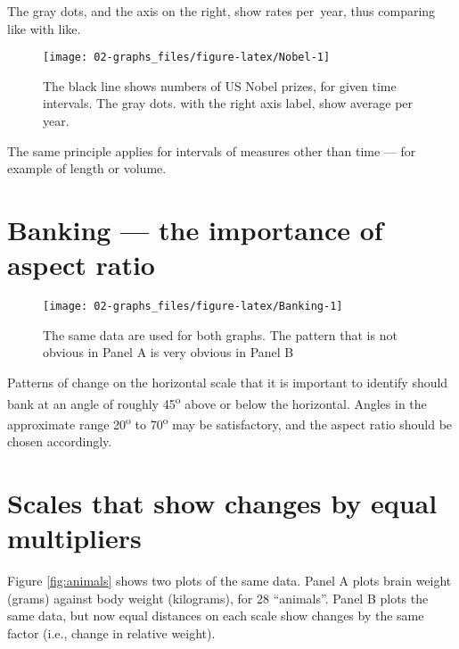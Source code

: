 \documentclass[
  10ptls,
  b5paper]{book}
\begin{document}
The gray dots, and the axis on the right, show rates per~year, thus comparing like with like.

\begin{figure}[H]

{\centering \texttt{[image: 02-graphs\_files/figure-latex/Nobel-1]} 

}

\caption{The black line shows numbers of US Nobel prizes, for given time intervals. The gray dots. with the right axis label, show average per year.}\label{fig:Nobel}
\end{figure}

The same principle applies for intervals of measures other than time --- for example of length or volume.

\section{Banking --- the importance of aspect ratio}\label{banking-the-importance-of-aspect-ratio}

\begin{figure}[H]

{\centering \texttt{[image: 02-graphs\_files/figure-latex/Banking-1]} 

}

\caption{The same data are used for both graphs.  The pattern that is not
obvious in Panel A is very obvious in Panel B}\label{fig:Banking}
\end{figure}

Patterns of change on the horizontal scale that it is important to identify should bank at an angle of roughly 45\textsuperscript{o} above or below the horizontal. Angles in the approximate range 20\textsuperscript{o} to 70\textsuperscript{o} may be satisfactory, and the aspect ratio should be chosen accordingly.

\section{Scales that show changes by equal multipliers}\label{scales-that-show-changes-by-equal-multipliers}

Figure \ref{fig:animals} shows two plots of the same data. Panel A plots brain weight (grams) against body weight (kilograms), for 28 ``animals''. Panel B plots the same data, but now equal distances on each scale show changes by the same factor (i.e., change in relative weight).
\end{document}
